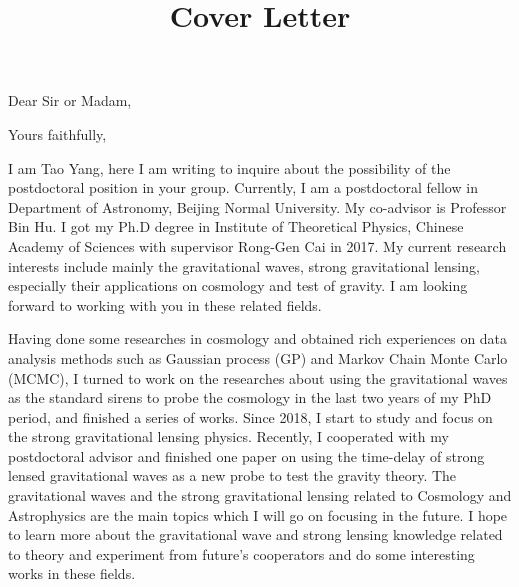 \documentclass[11pt,letterpaper,sans]{moderncv}   %
\title{Cover Letter}
\begin{document}
\opening{Dear Sir or Madam,}
\closing{Yours faithfully,}
\makelettertitle

I am Tao Yang, here I am writing to inquire about the possibility of the postdoctoral position in your group. Currently, I am a postdoctoral fellow in Department of Astronomy, Beijing Normal University. My co-advisor is Professor Bin Hu.  I got my Ph.D degree in Institute of Theoretical Physics, Chinese
Academy of Sciences  with supervisor Rong-Gen Cai in 2017. My current research interests include mainly the gravitational waves, strong gravitational lensing, especially their applications on cosmology and test of gravity. I am looking forward to working with you in these related fields.

Having done some researches in cosmology and obtained rich experiences on data analysis methods such as
Gaussian process (GP) and Markov Chain Monte Carlo (MCMC), I turned to work on the researches about
using the gravitational waves as the standard sirens to probe the cosmology in the last two years of my PhD
period, and finished a series of works. Since 2018, I start to study and focus on the strong gravitational lensing physics. Recently, I cooperated with my
postdoctoral advisor and finished one paper on using the time-delay of strong lensed gravitational waves as a
new probe to test the gravity theory. The gravitational waves and the strong gravitational lensing related to
Cosmology and Astrophysics are the main topics which I will go on focusing in the future. I hope to learn more about the gravitational wave and strong lensing
knowledge related to theory and experiment from future’s cooperators and do some interesting works in these
fields.

\vspace{10mm}

\makeletterclosing
\end{document}
